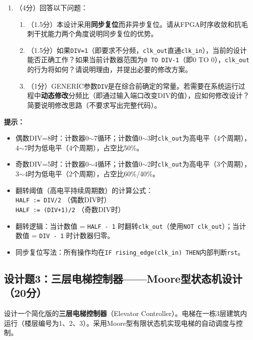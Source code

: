 \begin{enumerate}[label=(\arabic*)]
  \item （4分）回答以下问题：
  \begin{enumerate}
    \item （1.5分）本设计采用\textbf{同步复位}而非异步复位。请从FPGA时序收敛和抗毛刺干扰能力两个角度说明同步复位的优势。
    \item （1.5分）如果\texttt{DIV=1}（即要求不分频，\texttt{clk\_out}直通\texttt{clk\_in}），当前的设计能否正确工作？如果当前计数器范围为\texttt{0 TO DIV-1}（即0 TO 0），\texttt{clk\_out}的行为将如何？请说明理由，并提出必要的修改方案。
    \item （1分）GENERIC参数\texttt{DIV}是在综合前确定的常量。若需要在系统运行过程中\textbf{动态修改}分频比（即通过输入端口改变DIV的值），应如何修改设计？简要说明修改思路（不要求写出完整代码）。
  \end{enumerate}
\end{enumerate}

\begin{framed}
\textbf{提示：}
\begin{itemize}
  \item 偶数DIV=8时：计数器0$\sim$7循环；计数值0$\sim$3时\texttt{clk\_out}为高电平（4个周期），4$\sim$7时为低电平（4个周期），占空比50\%。
  \item 奇数DIV=5时：计数器0$\sim$4循环；计数值0$\sim$2时\texttt{clk\_out}为高电平（3个周期），3$\sim$4时为低电平（2个周期），占空比60\%/40\%。
  \item 翻转阈值（高电平持续周期数）的计算公式：\\
  \quad \texttt{HALF := DIV/2} \quad（偶数DIV时）\\
  \quad \texttt{HALF := (DIV+1)/2} \quad（奇数DIV时）
  \item 翻转逻辑：当计数值 = \texttt{HALF - 1} 时翻转\texttt{clk\_out}（使用\texttt{NOT clk\_out}）；当计数值 = \texttt{DIV - 1} 时计数器归零。
  \item 同步复位写法：所有操作均在\texttt{IF rising\_edge(clk\_in) THEN}内部判断\texttt{rst}。
\end{itemize}
\end{framed}

\newpage

\subsection*{设计题3：三层电梯控制器——Moore型状态机设计（20分）}

设计一个简化版的\textbf{三层电梯控制器}（Elevator Controller）。电梯在一栋3层建筑内运行（楼层编号为1、2、3）。采用Moore型有限状态机实现电梯的自动调度与控制。


